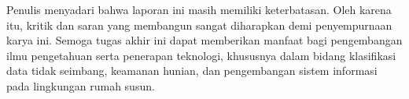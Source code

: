 {Penulis menyadari bahwa laporan ini masih memiliki keterbatasan. Oleh karena itu, kritik dan saran yang membangun sangat diharapkan demi penyempurnaan karya ini. Semoga tugas akhir ini dapat memberikan manfaat bagi pengembangan ilmu pengetahuan serta penerapan teknologi, khususnya dalam bidang klasifikasi data tidak seimbang, keamanan hunian, dan pengembangan sistem informasi pada lingkungan rumah susun.
}


% 

